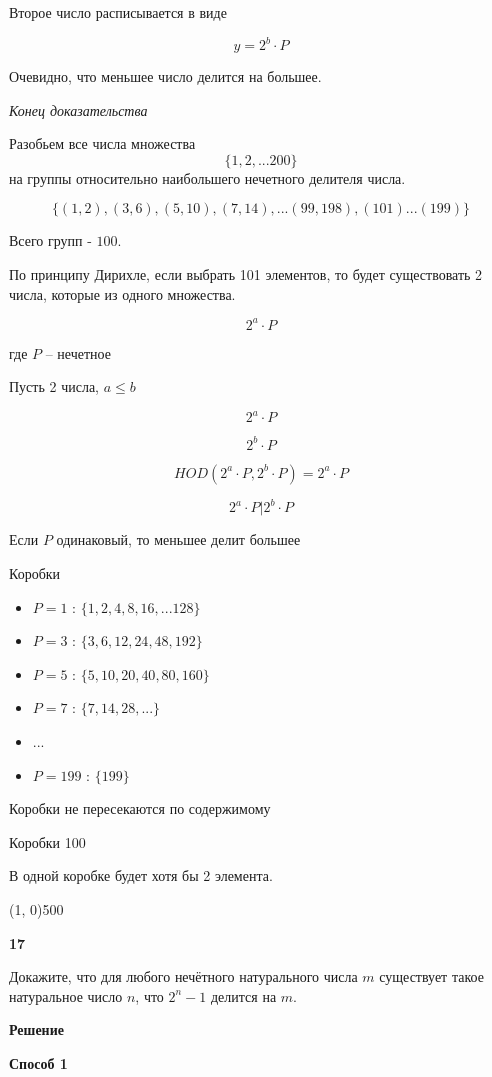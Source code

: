 \documentclass{article}
\begin{document}
Второе число расписывается в виде

$$y = 2 ^ b \cdot P$$

Очевидно, что меньшее число делится на большее.

\textit{Конец доказательства}

Разобьем все числа множества $$\{1, 2, ... 200\}$$  на группы относительно наибольшего нечетного делителя числа. 

$$\{ (1, 2), (3, 6), (5, 10), (7, 14), ...(99, 198),  (101) ... (199) \}$$

Всего групп -  $100$.

По принципу Дирихле, если выбрать 101 элементов, то будет существовать 2 числа, которые из одного множества. 
 
$$2^a \cdot P$$

где $P$ -- нечетное 

Пусть 2 числа, $a \le b$

$$2^a \cdot P$$

$$2^b \cdot P$$

$$HOD(2^a \cdot P, 2^b \cdot P) = 2^a \cdot P$$

$$2^a \cdot P  | 2^b \cdot P$$

Если $P$ одинаковый, то меньшее делит большее


Коробки 

\begin{itemize}
    \item $P = 1$ : $\{ 1, 2, 4, 8, 16, ... 128 \}$
    \item $P = 3$ : $\{ 3, 6, 12, 24, 48, 192 \}$
    \item $P = 5$  : $\{ 5, 10, 20, 40, 80, 160 \}$
    \item $P = 7$  : $\{ 7, 14, 28, ... \}$
    \item ...
    \item $P = 199$  : $\{199 \}$
\end{itemize}

Коробки не пересекаются по содержимому

Коробки 100

В одной коробке будет хотя бы 2 элемента. 
 
 
\line(1, 0){500}

\textbf{17}

Докажите, что для любого нечётного натурального числа  $m$ существует такое натуральное число $n$, что  $2^n - 1$  делится на $m$.

\textbf{Решение}

\textbf{Способ 1}
\end{document}
